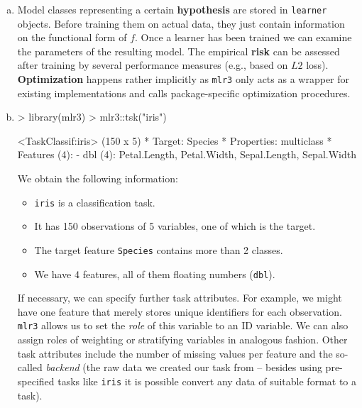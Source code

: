 \begin{enumerate}[a)]

  \item Model classes representing a certain \textbf{hypothesis} are stored in 
  \texttt{learner} objects. Before training them on actual data, they just 
  contain information on the functional form of $f$.
  Once a learner has been trained we can examine the parameters of the 
  resulting model.
  The empirical \textbf{risk} can be assessed after training by several 
  performance measures (e.g., based on $L2$ loss).
  \textbf{Optimization} happens rather implicitly as \texttt{mlr3} only acts as 
  a wrapper for existing implementations and calls package-specific 
  optimization procedures.
  
  \item
\begin{Schunk}
\begin{Sinput}
> library(mlr3)
> mlr3::tsk("iris")
\end{Sinput}
\begin{Soutput}
<TaskClassif:iris> (150 x 5)
* Target: Species
* Properties: multiclass
* Features (4):
  - dbl (4): Petal.Length, Petal.Width, Sepal.Length, Sepal.Width
\end{Soutput}
\end{Schunk}
  We obtain the following information:
  \begin{itemize}
    \item \texttt{iris} is a classification task.
    \item It has 150 observations of 5 variables, one of which is the 
    target.
    \item The target feature \texttt{Species} contains more than 2 classes.
    \item We have 4 features, all of them floating numbers (\texttt{dbl}).
  \end{itemize}
  If necessary, we can specify further task attributes. For example, we might 
  have one feature that merely stores unique identifiers for each observation. 
  \texttt{mlr3} allows us to set the \textit{role} of this variable to an 
  ID variable. We can also assign roles of weighting or stratifying variables in 
  analogous fashion. Other task attributes include the number of missing values 
  per feature and the so-called \textit{backend} (the raw data we created our 
  task from -- besides using pre-specified tasks like \texttt{iris} it is 
  possible convert any data of suitable format to a task).

\end{enumerate}
